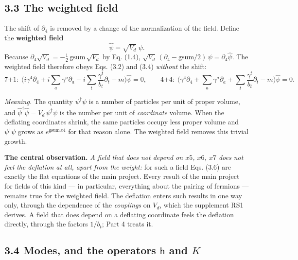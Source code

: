 \documentclass[
  10pt,
]{article}
\begin{document}
\hypertarget{the-weighted-field}{%
\subsection{3.3 The weighted field}\label{the-weighted-field}}

The shift of \(\partial_4\) is removed by a change of the normalization
of the field. Define the \textbf{weighted field}
\[\hat\psi=\sqrt{V_d}\;\psi .\tag{3.5}\] Because
\(\partial_4\sqrt{V_d}=-\tfrac12\,\mathrm{gsum}\,\sqrt{V_d}\) by Eq.
(1.4),
\(\sqrt{V_d}\,(\partial_4-\mathrm{gsum}/2)\,\psi=\partial_4\hat\psi\).
The weighted field therefore obeys Eqs. (3.2) and (3.4) \emph{without}
the shift:
\[\text{7+1:}\ \ \Big(i\gamma^4\partial_4+i\sum_a\gamma^a\partial_a+i\sum_t\frac{\gamma^t}{b_t}\partial_t-m\Big)\hat\psi=0,
\qquad
\text{4+4:}\ \ \Big(\gamma^4\partial_4+\sum_a\gamma^a\partial_a+\sum_t\frac{\gamma^t}{b_t}\partial_t-m\Big)\hat\psi=0 .\tag{3.6}\]

\emph{Meaning.} The quantity \(\psi^\dagger\psi\) is a number of
particles per unit of proper volume, and
\(\hat\psi^\dagger\hat\psi=V_d\,\psi^\dagger\psi\) is the number per
unit of \emph{coordinate} volume. When the deflating coordinates shrink,
the same particles occupy less proper volume and \(\psi^\dagger\psi\)
grows as \(e^{\mathrm{gsum}\,x4}\) for that reason alone. The weighted
field removes this trivial growth.

\textbf{The central observation.} \emph{A field that does not depend on
\(x5\), \(x6\), \(x7\) does not feel the deflation at all, apart from
the weight:} for such a field Eqs. (3.6) are exactly the flat equations
of the main project. Every result of the main project for fields of this
kind --- in particular, everything about the pairing of fermions ---
remains true for the weighted field. The deflation enters such results
in one way only, through the dependence of the \emph{couplings} on
\(V_d\), which the supplement RS1 derives. A field that does depend on a
deflating coordinate feels the deflation directly, through the factors
\(1/b_t\); Part 4 treats it.

\hypertarget{modes-and-the-operators-mathsf-h-and-k}{%
\subsection{\texorpdfstring{3.4 Modes, and the operators \(\mathsf h\)
and
\(K\)}{3.4 Modes, and the operators \textbackslash mathsf h and K}}\label{modes-and-the-operators-mathsf-h-and-k}}
\end{document}
